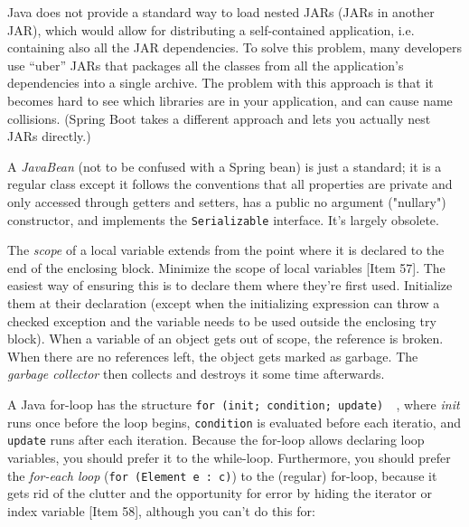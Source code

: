 \documentclass[table, xcdraw]{article}%
\begin{document}
Java does not provide a standard way to load nested JARs (JARs in another JAR), which would allow for distributing a self-contained application, i.e. containing also all the JAR dependencies. To solve this problem, many developers use “uber” JARs that packages all the classes from all the application’s dependencies into a single archive. The problem with this approach is that it becomes hard to see which libraries are in your application, and can cause name collisions. (Spring Boot takes a different approach and lets you actually nest JARs directly.)

A \emph{JavaBean} (not to be confused with a Spring bean) is just a standard; it is a regular class except it follows the conventions that all properties are private and only accessed through getters and setters, has a public no argument ("nullary") constructor, and implements the \texttt{Serializable} interface. It's largely obsolete.

The \emph{scope} of a local variable extends from the point where it is declared to the end of the enclosing block. Minimize the scope of local variables [Item 57]. The easiest way of ensuring this is to declare them where they're first used. Initialize them at their declaration (except when the initializing expression can throw a checked exception and the variable needs to be used outside the enclosing try block). When a variable of an object gets out of scope, the reference is broken. When there are no references left, the object gets marked as garbage. The \textit{garbage collector} then collects and destroys it some time afterwards.

A Java for-loop has the structure \texttt{for (init; condition; update) { }}, where \textit{init} runs once before the loop begins, \texttt{condition} is evaluated before each iteratio, and \texttt{update} runs after each iteration. Because the for-loop allows declaring loop variables, you should prefer it to the while-loop. Furthermore, you should prefer the \emph{for-each loop} (\texttt{for (Element e : c)}) to the (regular) for-loop, because it gets rid of the clutter and the opportunity for error by hiding the iterator or index variable [Item 58], although you can't do this for:
\end{document}
